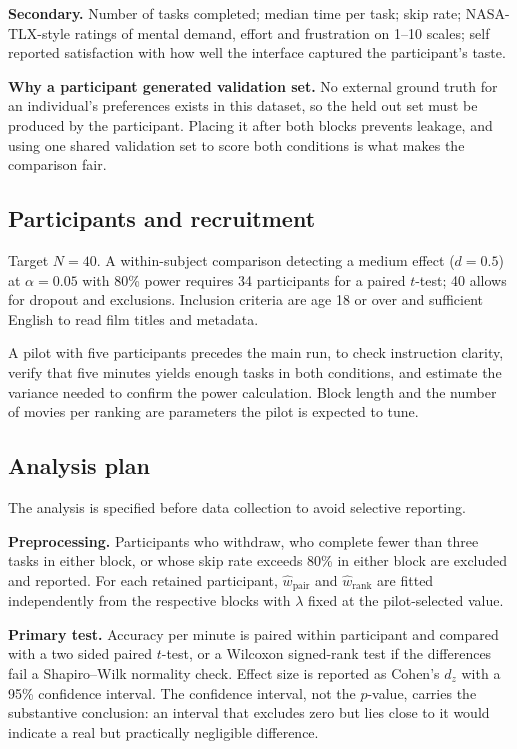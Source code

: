 \documentclass[11pt]{article}
\begin{document}
\textbf{Secondary.} Number of tasks completed; median time per task; skip rate; NASA-TLX-style ratings of mental demand, effort and frustration on 1--10 scales; self reported satisfaction with how well the interface captured the participant's taste.

\textbf{Why a participant generated validation set.} No external ground truth for an individual's preferences exists in this dataset, so the held out set must be produced by the participant. Placing it after both blocks prevents leakage, and using one shared validation set to score both conditions is what makes the comparison fair.


\subsection{Participants and recruitment}
Target $N = 40$. A within-subject comparison detecting a medium effect ($d = 0.5$) at $\alpha = 0.05$ with 80\% power requires 34 participants for a paired $t$-test; 40 allows for dropout and exclusions. Inclusion criteria are age 18 or over and sufficient English to read film titles and metadata.

A pilot with five participants precedes the main run, to check instruction clarity, verify that five minutes yields enough tasks in both conditions, and estimate the variance needed to confirm the power calculation. Block length and the number of movies per ranking are parameters the pilot is expected to tune.

\subsection{Analysis plan}
The analysis is specified before data collection to avoid selective reporting.

\textbf{Preprocessing.} Participants who withdraw, who complete fewer than three tasks in either block, or whose skip rate exceeds 80\% in either block are excluded and reported. For each retained participant, $\hat{w}_{\text{pair}}$ and $\hat{w}_{\text{rank}}$ are fitted independently from the respective blocks with $\lambda$ fixed at the pilot-selected value.

\textbf{Primary test.} Accuracy per minute is paired within participant and compared with a two sided paired $t$-test, or a Wilcoxon signed-rank test if the differences fail a Shapiro--Wilk normality check. Effect size is reported as Cohen's $d_z$ with a 95\% confidence interval. The confidence interval, not the $p$-value, carries the substantive conclusion: an interval that excludes zero but lies close to it would indicate a real but practically negligible difference.
\end{document}
